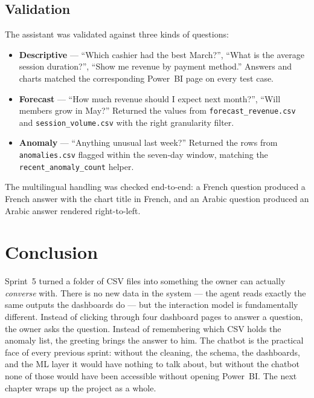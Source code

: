 \subsection{Validation}

The assistant was validated against three kinds of questions:

\begin{itemize}
  \item \textbf{Descriptive} --- ``Which cashier had the best March?'',
        ``What is the average session duration?'', ``Show me revenue by
        payment method.'' Answers and charts matched the corresponding
        Power~BI page on every test case.
  \item \textbf{Forecast} --- ``How much revenue should I expect next
        month?'', ``Will members grow in May?'' Returned the values
        from \texttt{forecast\_revenue.csv} and
        \texttt{session\_volume.csv} with the right granularity filter.
  \item \textbf{Anomaly} --- ``Anything unusual last week?'' Returned
        the rows from \texttt{anomalies.csv} flagged within the
        seven-day window, matching the \texttt{recent\_anomaly\_count}
        helper.
\end{itemize}

The multilingual handling was checked end-to-end: a French question
produced a French answer with the chart title in French, and an Arabic
question produced an Arabic answer rendered right-to-left.

\section{Conclusion}

Sprint~5 turned a folder of CSV files into something the owner can
actually \emph{converse} with. There is no new data in the system ---
the agent reads exactly the same outputs the dashboards do --- but the
interaction model is fundamentally different. Instead of clicking
through four dashboard pages to answer a question, the owner asks the
question. Instead of remembering which CSV holds the anomaly list, the
greeting brings the answer to him. The chatbot is the practical face
of every previous sprint: without the cleaning, the schema, the
dashboards, and the ML layer it would have nothing to talk about, but
without the chatbot none of those would have been accessible without
opening Power~BI. The next chapter wraps up the project as a whole.
